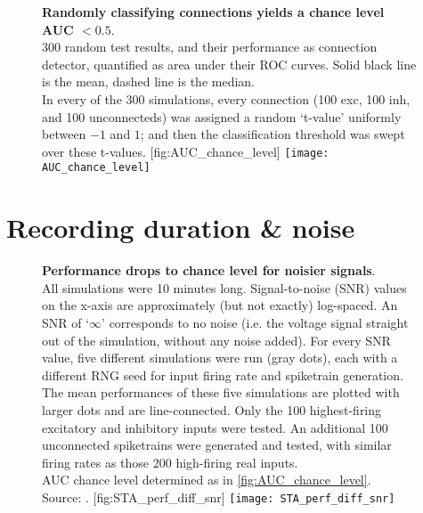 \begin{figure}
    \begin{sidecaption}
        {\textbf{Randomly classifying connections yields a chance level AUC $< 0.5$}.\\
        300 random test results, and their performance as connection detector, quantified as area under their ROC curves. Solid black line is the mean, dashed line is the median.\\
        In every of the 300 simulations, every connection (100 exc, 100 inh, and 100 unconnecteds) was assigned a random `t-value' uniformly between $-1$ and $1$; and then the classification threshold was swept over these t-values.}
        [fig:AUC_chance_level]
        \texttt{[image: AUC\_chance\_level]}
    \end{sidecaption}
\end{figure}



\FloatBarrier
\section{Recording duration \& noise}

\begin{figure}
    \begin{sidecaption}
        {\textbf{Performance drops to chance level for noisier signals}.\\
        All simulations were 10 minutes long.
        Signal-to-noise (SNR) values on the x-axis are approximately (but not exactly) log-spaced. An SNR of `$\infty$' corresponds to no noise (i.e. the voltage signal straight out of the simulation, without any noise added).
        For every SNR value, five different simulations were run (gray dots), each with a different RNG seed for input firing rate and spiketrain generation. The mean performances of these five simulations are plotted with larger dots and are line-connected.
        Only the 100 highest-firing excitatory and inhibitory inputs were tested. An additional 100 unconnected spiketrains were generated and tested, with similar firing rates as those 200 high-firing real inputs.\\
        AUC chance level determined as in \cref{fig:AUC_chance_level}.\\
        Source: .}
        [fig:STA_perf_diff_snr]
        \texttt{[image: STA\_perf\_diff\_snr]}
    \end{sidecaption}
\end{figure}

